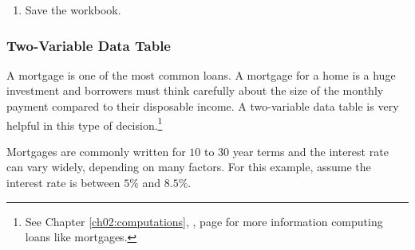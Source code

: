 \begin{enumerate}[resume]
	\item Save the  workbook.
\end{enumerate}

\subsubsection{Two-Variable Data Table}

A mortgage is one of the most common loans. A mortgage for a home is a huge investment and borrowers must think carefully about the size of the monthly payment compared to their disposable income. A two-variable data table is very helpful in this type of decision.\footnote{See Chapter \ref{ch02:computations}, , page \pageref{ch02:computations} for more information computing loans like mortgages.}

Mortgages are commonly written for $ 10 $ to $ 30 $ year terms and the interest rate can vary widely, depending on many factors. For this example, assume the interest rate is between $ 5\% $ and $ 8.5\% $.

